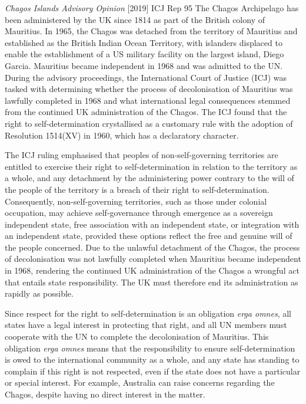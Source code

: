 \begin{casedetails}{\textit{Chagos Islands Advisory Opinion} [2019] ICJ Rep 95}
    \flushleft
    The Chagos Archipelago has been administered by the UK since 1814 as part of the British colony of Mauritius. In 1965, the Chagos was detached from the territory of Mauritius and established as the British Indian Ocean Territory, with islanders displaced to enable the establishment of a US military facility on the largest island, Diego Garcia. Mauritius became independent in 1968 and was admitted to the UN. During the advisory proceedings, the International Court of Justice (ICJ) was tasked with determining whether the process of decolonisation of Mauritius was lawfully completed in 1968 and what international legal consequences stemmed from the continued UK administration of the Chagos. The ICJ found that the right to self-determination crystallised as a customary rule with the adoption of Resolution 1514(XV) in 1960, which has a declaratory character.

    \vspace{\baselineskip}

    The ICJ ruling emphasised that peoples of non-self-governing territories are entitled to exercise their right to self-determination in relation to the territory as a whole, and any detachment by the administering power contrary to the will of the people of the territory is a breach of their right to self-determination. Consequently, non-self-governing territories, such as those under colonial occupation, may achieve self-governance through emergence as a sovereign independent state, free association with an independent state, or integration with an independent state, provided these options reflect the free and genuine will of the people concerned. Due to the unlawful detachment of the Chagos, the process of decolonisation was not lawfully completed when Mauritius became independent in 1968, rendering the continued UK administration of the Chagos a wrongful act that entails state responsibility. The UK must therefore end its administration as rapidly as possible.

    \vspace{\baselineskip}

    Since respect for the right to self-determination is an obligation \textit{erga omnes}, all states have a legal interest in protecting that right, and all UN members must cooperate with the UN to complete the decolonisation of Mauritius. This obligation \textit{erga omnes} means that the responsibility to ensure self-determination is owed to the international community as a whole, and any state has standing to complain if this right is not respected, even if the state does not have a particular or special interest. For example, Australia can raise concerns regarding the Chagos, despite having no direct interest in the matter.
\end{casedetails}

